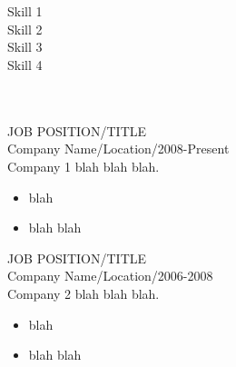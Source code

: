 \documentclass[12pt, a4paper, conference]{IEEEtran}
\begin{document}
\begin{minipage}[t][5cm][t]{0.3\textwidth}
{}\\
\\
Skill 1\\

Skill 2\\

Skill 3\\

Skill 4

\end{minipage}
\quad
\vrule height 4ex width 1pt
\quad
\begin{minipage}[t][5cm][t]{0.6\textwidth}
{}\\
\\
JOB POSITION/TITLE\\
Company Name/Location/2008-Present\\
Company 1 blah blah blah.
\begin{itemize}
\item blah
\item blah blah\\
\end{itemize}

JOB POSITION/TITLE\\
Company Name/Location/2006-2008\\
Company 2 blah blah blah.
\begin{itemize}
\item blah
\item blah blah
\end{itemize}

\end{minipage}

\noindent\makebox[0cm]{\rule{12.93cm}{1pt}}
\end{document}

